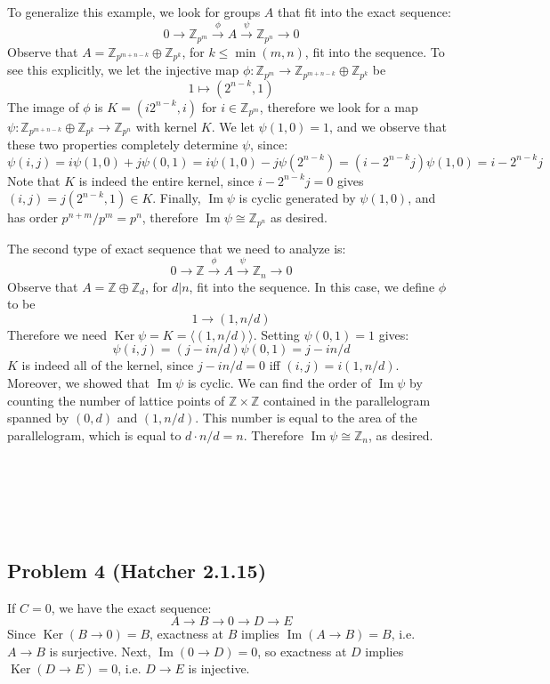 \documentclass[12 pt]{article}
\newcommand{\Z}{\mathbb{Z}}
\DeclareMathOperator{\Ker}{Ker}
\DeclareMathOperator{\imag}{Im}
\begin{document}
To generalize this example, we look for groups $A$ that fit into the exact sequence:
\[	0 \to \Z_{p^m} \overset{\phi}{\to} A \overset{\psi}{\to} \Z_{p^n} \to 0	\]
Observe that $A = \Z_{p^{m+n-k}} \oplus \Z_{p^{k}}$, for $k \leq \min(m,n)$, fit into the sequence. To
see this explicitly, we let the injective map $\phi : \Z_{p^m} \to \Z_{p^{m+n-k}} \oplus \Z_{p^{k}}$
be
\[	1 \mapsto (2^{n-k}, 1)	\]
The image of $\phi$ is $K = (i 2^{n-k}, i)$ for $i \in \Z_{p^m}$, therefore we look for a map $\psi : \Z_{p^{m+n-k}} 
\oplus \Z_{p^{k}} \to \Z_{p^n}$ with kernel $K$. We let $\psi(1,0) = 1$, and we observe that these two properties 
completely determine $\psi$, since:
\[	\psi(i,j) = i\psi(1,0) + j \psi(0,1) = i \psi(1,0) - j \psi(2^{n-k}) = (i - 2^{n-k} j) \psi(1,0) = i - 2^{n-k} j	\]
Note that $K$ is indeed the entire kernel, since $i - 2^{n-k} j = 0$ gives $(i,j) = j (2^{n-k}, 1) \in K$. Finally, $\imag
\psi$ is cyclic generated by $\psi(1,0)$, and has order $p^{n+m} / p^m = p^n$, therefore $\imag \psi \cong \Z_{p^n}$
as desired.

The second type of exact sequence that we need to analyze is:
\[	0 \to \Z \overset{\phi}{\to} A \overset{\psi}{\to} \Z_n \to 0	\]
Observe that $A = \Z \oplus \Z_d$, for $d | n$, fit into the sequence. In this case, we define $\phi$ to be
\[	1 \to (1, n/d)	\]
Therefore we need $\Ker \psi = K = \langle (1, n/d) \rangle$. Setting $\psi(0,1) = 1$ gives:
\[	\psi(i,j) = (j - i n/d) \psi(0,1) = j - i n/d	\]
$K$ is indeed all of the kernel, since $j-in/d = 0$ iff $(i,j) = i (1, n/d)$. Moreover, we showed that $\imag \psi$
is cyclic. We can find the order of $\imag \psi$ by counting the number of lattice points of $\Z \times \Z$ contained
in the parallelogram spanned by $(0,d)$ and $(1, n/d)$. This number is equal to the area of the parallelogram, which
is equal to $d \cdot n/d = n$. Therefore $\imag \psi \cong \Z_n$, as desired.
\\
\\
\\
\\
\\
\\

\subsection*{Problem 4 (Hatcher 2.1.15)}
If $C = 0$, we have the exact sequence:
\[	A \to B \to 0 \to D \to E	\]
Since $\Ker (B \to 0) = B$, exactness at $B$ implies $\imag (A \to B) = B$, i.e. $A\to B$ is surjective.
Next, $\imag (0 \to D) = 0$, so exactness at $D$ implies $\Ker(D \to E) = 0$, i.e. $D\to E$ is injective.
\end{document}
